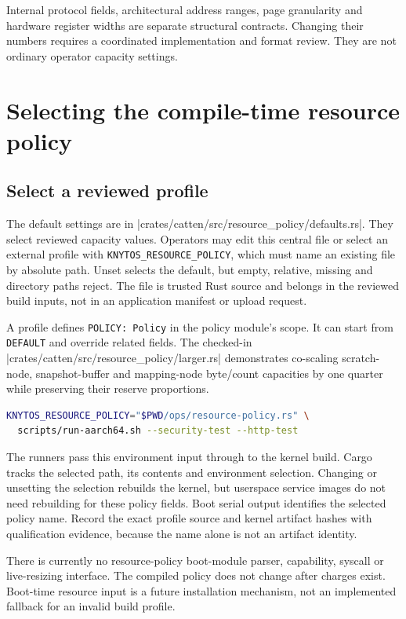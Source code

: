 Internal protocol fields, architectural address ranges, page granularity and
hardware register widths are separate structural contracts. Changing their
numbers requires a coordinated implementation and format review. They are not
ordinary operator capacity settings.

\section{Selecting the compile-time resource policy}

\subsection{Select a reviewed profile}

The default settings are in
\repofile|crates/catten/src/resource_policy/defaults.rs|. They select reviewed
capacity values. Operators may edit this central file or select an external
profile with \texttt{KNYTOS\_RESOURCE\_POLICY}, which must name an existing file
by absolute path. Unset selects the default, but empty, relative, missing and
directory paths reject. The file is trusted Rust source and belongs in the
reviewed build inputs, not in an application manifest or upload request.

A profile defines \texttt{POLICY: Policy} in the policy module's scope. It can
start from \texttt{DEFAULT} and override related fields. The checked-in
\repofile|crates/catten/src/resource_policy/larger.rs| demonstrates co-scaling
scratch-node, snapshot-buffer and mapping-node byte/count capacities by one
quarter while preserving their reserve proportions.

\begin{lstlisting}[language=bash]
KNYTOS_RESOURCE_POLICY="$PWD/ops/resource-policy.rs" \
  scripts/run-aarch64.sh --security-test --http-test
\end{lstlisting}

The runners pass this environment input through to the kernel build. Cargo
tracks the selected path, its contents and environment selection. Changing or
unsetting the selection rebuilds the kernel, but userspace service images do not
need rebuilding for these policy fields. Boot serial output identifies the
selected policy name. Record the exact profile source and kernel artifact
hashes with qualification evidence, because the name alone is not an artifact identity.

There is currently no resource-policy boot-module parser, capability, syscall
or live-resizing interface. The compiled policy does not change after charges
exist. Boot-time resource input is a future installation mechanism, not an
implemented fallback for an invalid build profile.


